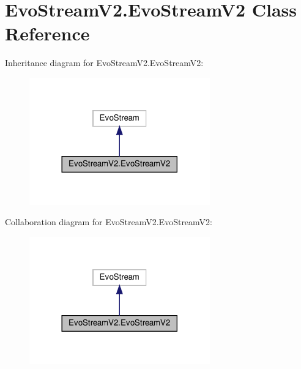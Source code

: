 \hypertarget{classEvoStreamV2_1_1EvoStreamV2}{}\section{Evo\+Stream\+V2.\+Evo\+Stream\+V2 Class Reference}
\label{classEvoStreamV2_1_1EvoStreamV2}


Inheritance diagram for Evo\+Stream\+V2.\+Evo\+Stream\+V2\+:
\nopagebreak
\begin{figure}[H]
\begin{center}
\leavevmode
\includegraphics[width=221pt]{classEvoStreamV2_1_1EvoStreamV2__inherit__graph}
\end{center}
\end{figure}


Collaboration diagram for Evo\+Stream\+V2.\+Evo\+Stream\+V2\+:
\nopagebreak
\begin{figure}[H]
\begin{center}
\leavevmode
\includegraphics[width=221pt]{classEvoStreamV2_1_1EvoStreamV2__coll__graph}
\end{center}
\end{figure}
